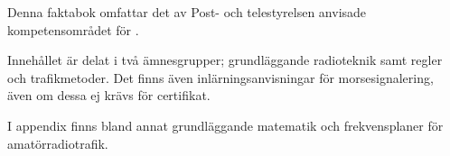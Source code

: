 Denna faktabok omfattar det av Post- och telestyrelsen anvisade
kompetensområdet för .

Innehållet är delat i två ämnesgrupper; grundläggande radioteknik
samt regler och trafikmetoder.
Det finns även inlärningsanvisningar för morsesignalering,
även om dessa ej krävs för certifikat.

I appendix finns bland annat grundläggande matematik
och frekvensplaner för amatörradiotrafik.
